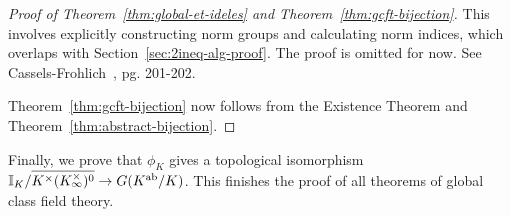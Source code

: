 \begin{proof}[Proof of Theorem~\ref{thm:global-et-ideles} and Theorem~\ref{thm:gcft-bijection}]
This involves explicitly constructing norm groups and calculating norm indices, which overlaps with Section~\ref{sec:2ineq-alg-proof}. The proof is omitted for now. See Cassels-Frohlich~\cite{CF69}, pg. 201-202.

Theorem~\ref{thm:gcft-bijection} now follows from the Existence Theorem and Theorem~\ref{thm:abstract-bijection}.
\end{proof}
Finally, we prove that $\phi_K$ gives a topological isomorphism  $\mathbb{I}_K/\overline{K^{\times}(K_{\infty}^{\times})^0}\to G(K^{\text{ab}}/K)$. This finishes the proof of all theorems of global class field theory.
